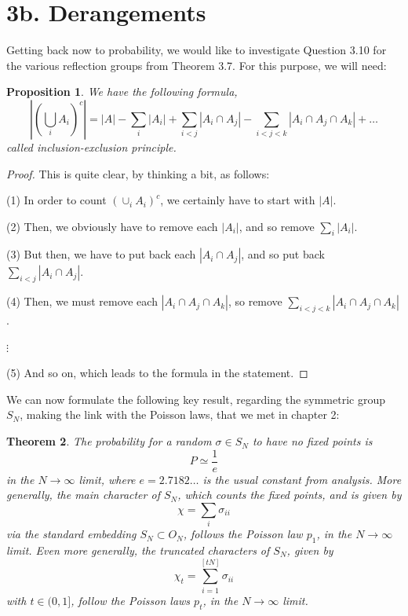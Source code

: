 \documentclass[12pt]{amsbook}
\newtheorem{theorem}{Theorem}[chapter]
\newtheorem{proposition}[theorem]{Proposition}
\begin{document}
\section*{3b. Derangements}

Getting back now to probability, we would like to investigate Question 3.10 for the various reflection groups from Theorem 3.7. For this purpose, we will need:

\begin{proposition}
We have the following formula,
$$\left|\left(\bigcup_iA_i\right)^c\right|=|A|-\sum_i|A_i|+\sum_{i<j}|A_i\cap A_j|-\sum_{i<j<k}|A_i\cap A_j\cap A_k|+\ldots$$
called inclusion-exclusion principle.
\end{proposition}

\begin{proof}
This is quite clear, by thinking a bit, as follows:

\medskip

(1) In order to count $(\cup_iA_i)^c$, we certainly have to start with $|A|$.

\medskip

(2) Then, we obviously have to remove each $|A_i|$, and so remove $\sum_i|A_i|$.

\medskip

(3) But then, we have to put back each $|A_i\cap A_j|$, and so put back $\sum_{i<j}|A_i\cap A_j|$.

\medskip

(4) Then, we must remove each $|A_i\cap A_j\cap A_k|$, so remove $\sum_{i<j<k}|A_i\cap A_j\cap A_k|$.

\medskip

$\vdots$

\medskip

(5) And so on, which leads to the formula in the statement.
\end{proof}

We can now formulate the following key result, regarding the symmetric group $S_N$, making the link with the Poisson laws, that we met in chapter 2:


\begin{theorem}
The probability for a random $\sigma\in S_N$ to have no fixed points is
$$P\simeq\frac{1}{e}$$
in the $N\to\infty$ limit, where $e=2.7182\ldots$ is the usual constant from analysis. More generally, the main character of $S_N$, which counts the fixed points, and is given by
$$\chi=\sum_i\sigma_{ii}$$
via the standard embedding $S_N\subset O_N$, follows the Poisson law $p_1$, in the $N\to\infty$ limit. Even more generally, the truncated characters of $S_N$, given by
$$\chi_t=\sum_{i=1}^{[tN]}\sigma_{ii}$$
with $t\in(0,1]$, follow the Poisson laws $p_t$, in the $N\to\infty$ limit. 
\end{theorem}
\end{document}
